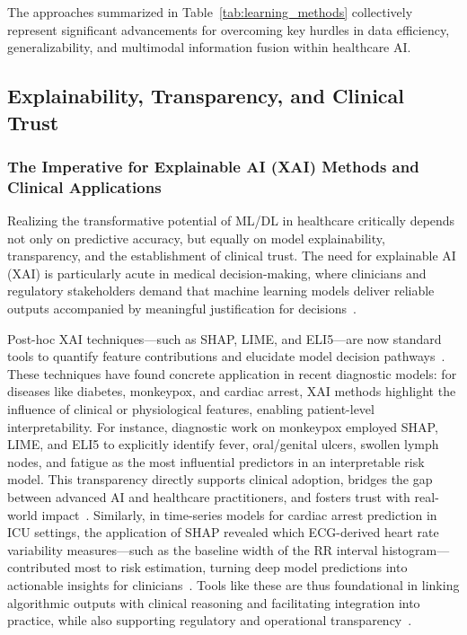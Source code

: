 \documentclass[sigconf]{acmart}
\begin{document}
The approaches summarized in Table~\ref{tab:learning_methods} collectively represent significant advancements for overcoming key hurdles in data efficiency, generalizability, and multimodal information fusion within healthcare AI.

\subsection{Explainability, Transparency, and Clinical Trust}

\subsubsection{The Imperative for Explainable AI (XAI) Methods and Clinical Applications}

Realizing the transformative potential of ML/DL in healthcare critically depends not only on predictive accuracy, but equally on model explainability, transparency, and the establishment of clinical trust. The need for explainable AI (XAI) is particularly acute in medical decision-making, where clinicians and regulatory stakeholders demand that machine learning models deliver reliable outputs accompanied by meaningful justification for decisions~\cite{ref11,ref39,ref50,ref65,ref80}.

Post-hoc XAI techniques—such as SHAP, LIME, and ELI5—are now standard tools to quantify feature contributions and elucidate model decision pathways~\cite{ref11,ref28,ref36,ref50,ref65}. These techniques have found concrete application in recent diagnostic models: for diseases like diabetes, monkeypox, and cardiac arrest, XAI methods highlight the influence of clinical or physiological features, enabling patient-level interpretability. For instance, diagnostic work on monkeypox employed SHAP, LIME, and ELI5 to explicitly identify fever, oral/genital ulcers, swollen lymph nodes, and fatigue as the most influential predictors in an interpretable risk model. This transparency directly supports clinical adoption, bridges the gap between advanced AI and healthcare practitioners, and fosters trust with real-world impact~\cite{ref11}. Similarly, in time-series models for cardiac arrest prediction in ICU settings, the application of SHAP revealed which ECG-derived heart rate variability measures—such as the baseline width of the RR interval histogram—contributed most to risk estimation, turning deep model predictions into actionable insights for clinicians~\cite{ref80}. Tools like these are thus foundational in linking algorithmic outputs with clinical reasoning and facilitating integration into practice, while also supporting regulatory and operational transparency~\cite{ref11,ref28,ref32,ref36,ref39,ref50,ref65,ref98}.
\end{document}
